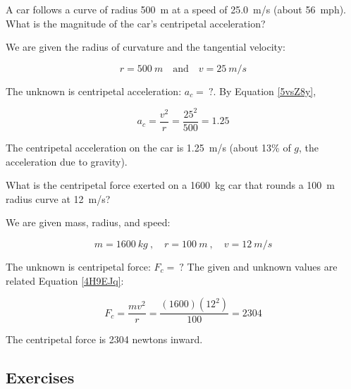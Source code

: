 \documentclass[main.tex]{subfiles}
\begin{document}
\begin{example}
    A car follows a curve of radius \SI{500}{m} at a speed of \SI{25.0}{m/s} (about \SI{56}{mph}). What is the magnitude of the car's centripetal acceleration?
\end{example}

\Solution We are given the radius of curvature and the tangential velocity:

\begin{equation*}
    r = \SI{500}{m} \quad \text{and} \quad v = \SI{25}{m/s}
\end{equation*}

The unknown is centripetal acceleration: $a_c =\ ?$. By Equation \eqref{5vsZ8y},

\begin{equation*}
    a_c = \frac{v^2}{r} = \frac{25^2}{500} = 1.25 
\end{equation*}

The centripetal acceleration on the car is \SI{1.25}{m/s} (about 13\% of $g$, the acceleration due to gravity).

\endsolution

\begin{example}
    What is the centripetal force exerted on a \SI{1600}{kg} car that rounds a \SI{100}{m} radius curve at \SI{12}{m/s}?
\end{example}

\Solution We are given mass, radius, and speed:

\begin{equation*}
    m = \SI{1600}{kg}\ , \quad 
    r = \SI{100}{m}\ , \quad
    v = \SI{12}{m/s}
\end{equation*}

The unknown is centripetal force: $F_c =\ ?$ The given and unknown values are related Equation \eqref{4H9EJq}:

\begin{equation*}
    F_c = \frac{m v^2}{r} = \frac{(1600)(12^2)}{100} = 2304
\end{equation*}

The centripetal force is 2304 newtons inward. 

\endsolution

\subsection{Exercises}

\subsubsection*{}
\end{document}
